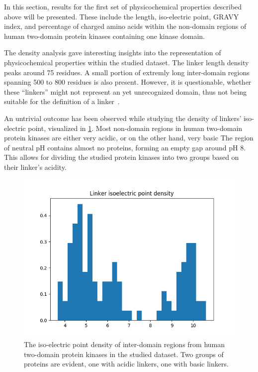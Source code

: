 \label{res}

\label{res:first}

	In this section, results for the first set of physicochemical properties described
	above will be presented.
	These include the length, iso-electric point, GRAVY index, and percentage of charged
	amino acids within the non-domain regions of human two-domain protein kinases containing
	one kinase domain.

	\label{res:first:dens}

		The density analysis gave interesting insights into the representation of
		physicochemical properties within the studied dataset.
		The linker length density peaks around 75 residues.
		A small portion of extremly long inter-domain regions spanning 500 to 800 residues is
		also present.
		However, it is questionable, whether these ``linkers'' might not represent an yet
		unrecognized domain, thus not being suitable for the definition of a
		linker~\cite{milano2016structural}.

		An untrivial outcome has been observed while studying the density of linkers'
		iso-electric point, visualized in \cref{fig:iso-dens}.
		Most non-domain regions in human two-domain protein kinases are either very acidic, or
		on the other hand, very basic
		The region of neutral pH contains almost no proteins, forming an empty gap around pH
		8.
		This allows for dividing the studied protein kinases into two groups based on their
		linker's acidity.

		\begin{figure}
			\centering
			\includegraphics[width=.7\linewidth]{img/iso_density.png}
			\caption{The iso-electric point density of inter-domain regions from human
			two-domain protein kinases in the studied dataset. Two groups of proteins are
			evident, one with acidic linkers, one with basic linkers.}
			\label{fig:iso-dens}
		\end{figure}

